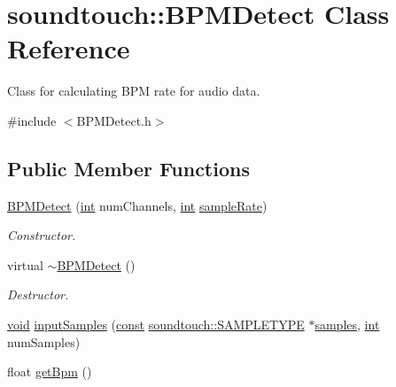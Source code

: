 \hypertarget{classsoundtouch_1_1_b_p_m_detect}{}\section{soundtouch\+:\+:B\+P\+M\+Detect Class Reference}
\label{classsoundtouch_1_1_b_p_m_detect}


Class for calculating B\+PM rate for audio data.  




{\ttfamily \#include $<$B\+P\+M\+Detect.\+h$>$}

\subsection*{Public Member Functions}
\begin{DoxyCompactItemize}
\item 
\hyperlink{classsoundtouch_1_1_b_p_m_detect_a8f3a5437abb588512102995e436b980e}{B\+P\+M\+Detect} (\hyperlink{xmltok_8h_a5a0d4a5641ce434f1d23533f2b2e6653}{int} num\+Channels, \hyperlink{xmltok_8h_a5a0d4a5641ce434f1d23533f2b2e6653}{int} \hyperlink{classsoundtouch_1_1_b_p_m_detect_a9c0ca4351a4239dab4ad4d4655d7b8c9}{sample\+Rate})
\begin{DoxyCompactList}\small\item\em Constructor. \end{DoxyCompactList}\item 
virtual \hyperlink{classsoundtouch_1_1_b_p_m_detect_af2742a5eeddc39abc8733def278a869c}{$\sim$\+B\+P\+M\+Detect} ()
\begin{DoxyCompactList}\small\item\em Destructor. \end{DoxyCompactList}\item 
\hyperlink{sound_8c_ae35f5844602719cf66324f4de2a658b3}{void} \hyperlink{classsoundtouch_1_1_b_p_m_detect_aa234163e246eee0bab923272ce85a93f}{input\+Samples} (\hyperlink{getopt1_8c_a2c212835823e3c54a8ab6d95c652660e}{const} \hyperlink{namespacesoundtouch_a97cfd29a7abb4d4b2a72f803d5b5850c}{soundtouch\+::\+S\+A\+M\+P\+L\+E\+T\+Y\+PE} $\ast$\hyperlink{test__w__saw8_8c_a54185623a5a093f671a73e5fba6197a1}{samples}, \hyperlink{xmltok_8h_a5a0d4a5641ce434f1d23533f2b2e6653}{int} num\+Samples)
\item 
float \hyperlink{classsoundtouch_1_1_b_p_m_detect_ae5b0abdfe3b9cdf62c1e7a473cda1d20}{get\+Bpm} ()
\end{DoxyCompactItemize}
